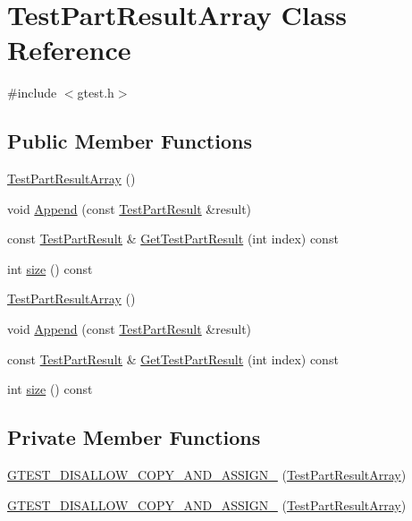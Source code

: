 \hypertarget{classtesting_1_1TestPartResultArray}{\section{\-Test\-Part\-Result\-Array \-Class \-Reference}
\label{dc/dce/classtesting_1_1TestPartResultArray}
}


{\ttfamily \#include $<$gtest.\-h$>$}

\subsection*{\-Public \-Member \-Functions}
\begin{DoxyCompactItemize}
\item 
\hyperlink{classtesting_1_1TestPartResultArray_aa250e77c4c72ec045d18b1fcd9af65db}{\-Test\-Part\-Result\-Array} ()
\item 
void \hyperlink{classtesting_1_1TestPartResultArray_a3a9ecce0ea05e8ce5e1d3dbb2b8e1f97}{\-Append} (const \hyperlink{classtesting_1_1TestPartResult}{\-Test\-Part\-Result} \&result)
\item 
const \hyperlink{classtesting_1_1TestPartResult}{\-Test\-Part\-Result} \& \hyperlink{classtesting_1_1TestPartResultArray_ac06c4578a2597b98ca5e82c1dc0fc329}{\-Get\-Test\-Part\-Result} (int index) const 
\item 
int \hyperlink{classtesting_1_1TestPartResultArray_ab8e4e3e2a7bf18888b71bdf9dda0770b}{size} () const 
\item 
\hyperlink{classtesting_1_1TestPartResultArray_aa250e77c4c72ec045d18b1fcd9af65db}{\-Test\-Part\-Result\-Array} ()
\item 
void \hyperlink{classtesting_1_1TestPartResultArray_a3a9ecce0ea05e8ce5e1d3dbb2b8e1f97}{\-Append} (const \hyperlink{classtesting_1_1TestPartResult}{\-Test\-Part\-Result} \&result)
\item 
const \hyperlink{classtesting_1_1TestPartResult}{\-Test\-Part\-Result} \& \hyperlink{classtesting_1_1TestPartResultArray_a5c1c1eb45543a84bed1b478902454e40}{\-Get\-Test\-Part\-Result} (int index) const 
\item 
int \hyperlink{classtesting_1_1TestPartResultArray_ab8e4e3e2a7bf18888b71bdf9dda0770b}{size} () const 
\end{DoxyCompactItemize}
\subsection*{\-Private \-Member \-Functions}
\begin{DoxyCompactItemize}
\item 
\hyperlink{classtesting_1_1TestPartResultArray_afa8b17bf6cfd16bb6a46b5f4a7b05585}{\-G\-T\-E\-S\-T\-\_\-\-D\-I\-S\-A\-L\-L\-O\-W\-\_\-\-C\-O\-P\-Y\-\_\-\-A\-N\-D\-\_\-\-A\-S\-S\-I\-G\-N\-\_\-} (\hyperlink{classtesting_1_1TestPartResultArray}{\-Test\-Part\-Result\-Array})
\item 
\hyperlink{classtesting_1_1TestPartResultArray_afa8b17bf6cfd16bb6a46b5f4a7b05585}{\-G\-T\-E\-S\-T\-\_\-\-D\-I\-S\-A\-L\-L\-O\-W\-\_\-\-C\-O\-P\-Y\-\_\-\-A\-N\-D\-\_\-\-A\-S\-S\-I\-G\-N\-\_\-} (\hyperlink{classtesting_1_1TestPartResultArray}{\-Test\-Part\-Result\-Array})
\end{DoxyCompactItemize}
